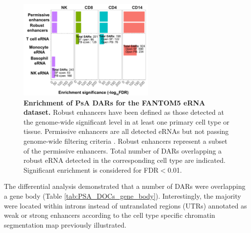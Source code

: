 \begin{figure}[htbp]
\centering
\includegraphics[width=0.6\textwidth]{./Results3/pdfs/ATAC_PsA_FANTOM_enhancer_enrichment_all_cell_types}
\caption[Enrichment of PsA DARs for the FANTOM5 eRNA dataset.]{\textbf{Enrichment of PsA DARs for the FANTOM5 eRNA dataset.} Robust enhancers have been defined as those detected at the genome-wide significant level in at least one primary cell type or tissue. Permissive enhancers are all detected eRNAs but not passing genome-wide filtering criteria \parencite{Andersson2014}. Robust enhancers represent a subset of the permissive enhancers. Total number of DARs overlapping a robust eRNA detected in the corresponding cell type are indicated. Significant enrichment is considered for FDR$<$0.01.}
\label{figure:PSA_FANTOM}
\end{figure}

The differential analysis demonstrated that a number of DARs were overlapping a gene body (Table \ref{tab:PSA_DOCs_gene_body}). Interestingly, the majority were located within introns instead of untranslated regions (UTRs) annotated as weak or strong enhancers according to the cell type specific chromatin segmentation map previously illustrated. 



